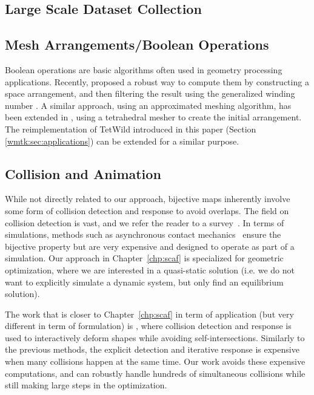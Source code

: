 \subsection{Large Scale Dataset Collection} 

\subsection{Mesh Arrangements/Boolean Operations} 

Boolean operations are basic algorithms often used in geometry processing applications. Recently, \cite{zhou2016mesh} proposed a robust way to compute them by constructing a space arrangement, and then filtering the result using the generalized winding number \cite{Jacobson:2013}. A similar approach, using an approximated meshing algorithm, has been extended in \cite{Hu:2019:fTetWild}, using a tetrahedral mesher to create the initial arrangement. The reimplementation of TetWild introduced in this paper (Section \ref{wmtk:sec:applications}) can be extended for a similar purpose.

\subsection{Collision and Animation}
While not directly related to our approach, bijective maps inherently  involve some form of collision detection and response to avoid overlaps.  The field on collision detection is vast, and we refer the reader to a survey~\cite{jimenez:2001}. 
In terms of simulations, methods such as asynchronous contact mechanics~\cite{Harmon:2009,harmon2010robust,Ainsley:2012} ensure the bijective property but are very expensive and designed to operate as part of a simulation. Our approach in Chapter~\ref{chp:scaf} is specialized for geometric optimization, where we are interested in a  quasi-static solution (i.e. we do not want to explicitly simulate a dynamic system, but only find an equilibrium solution).

The work that is closer to Chapter~\ref{chp:scaf} in term of application (but very different in term of formulation) is \cite{Harmon:2011}, where collision detection and response is used to interactively deform shapes while avoiding self-intersections. Similarly to the previous methods, the explicit detection and iterative response is expensive when many collisions happen at the same time.  Our work avoids these expensive computations, and can robustly handle hundreds of simultaneous collisions while still making large steps in the optimization.


